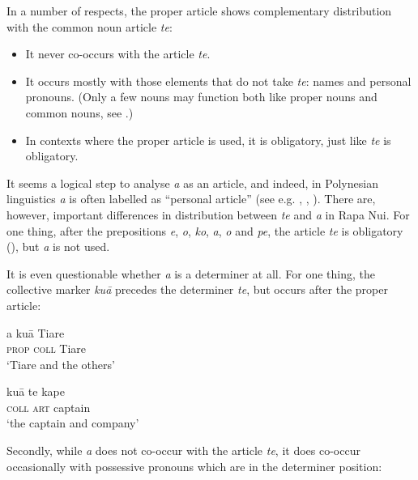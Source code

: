 In a number of respects, the proper article shows complementary distribution with the common noun article \textit{te}:

\begin{itemize}
\item 
It never co-occurs with the article \textit{te}.

\item 
It occurs mostly with those elements that do not take \textit{te}: names and personal pronouns. (Only a few nouns may function both like proper nouns and common nouns, see .)

\item 
In contexts where the proper article is used, it is obligatory, just like \textit{te} is obligatory.

\end{itemize}

It seems a logical step to analyse \textit{a} as an article, and indeed, in Polynesian linguistics \textit{a} is often labelled as “personal article” (see e.g. \citealt[58]{Clark1976}, \citealt[109]{Bauer1993}, \citealt[62]{Cablitz2006}). There are, however, important differences in distribution between \textit{te} and \textit{a} in Rapa Nui. For one thing, after the prepositions \textit{e}, \textit{o}, \textit{ko}, \textit{a}, \textit{o} and \textit{pe}, the article \textit{te} is obligatory (), but \textit{a} is not used.

It is even questionable whether \textit{a} is a determiner at all. For one thing, the collective marker \textit{kuā} precedes the determiner \textit{te}, but occurs after the proper article:

\ea\label{ex:5.196}
\gll a kuā Tiare \\
\textsc{prop} \textsc{coll} Tiare \\

\glt 
‘Tiare and the others’ \textstyleExampleref{[R315.227]} 
\z

\ea\label{ex:5.197}
\gll kuā te kape \\
\textsc{coll} \textsc{art} captain \\

\glt
‘the captain and company’ \textstyleExampleref{[R416.864]} 
\z

Secondly, while \textit{a} does not co-occur with the article \textit{te}, it does co-occur occasionally with possessive pronouns which are in the determiner position:

